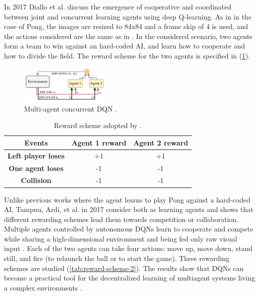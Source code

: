 In 2017 Diallo et al. \cite{diallo2017learning} discuss the emergence of cooperative and coordinated between joint and concurrent learning
agents using deep Q-learning.
%
As in \cite{mnih2013playing} in the case of Pong, the images are resized to 84x84 and a frame skip of 4 is used, and the actions considered are the same as in \cite{makarov2017learning}.
%
In the considered scenario, two agents form a team to win against an hard-coded AI,
and learn how to cooperate and how to divide the field.
%
The reward scheme for the two agents is specified in (\cref{tab:reward-scheme}).

\begin{figure}[ht]
  \centering
  \includegraphics[width=0.4\textwidth]{images/DQN_MAS.png}
  \caption{Multi-agent concurrent DQN \cite{diallo2017learning}.}
  \label{fig:dqnmas}
\end{figure}

\begin{table}[ht]
  \renewcommand{\arraystretch}{1.3}
  \caption{Reward scheme adopted by \cite{diallo2017learning}.}
  \label{tab:reward-scheme}
  \centering
  \begin{tabular}{@{}ccc@{}}
    \toprule
    \textbf{Events}            & \textbf{Agent 1 reward} & \textbf{Agent 2 reward} \\ \midrule
    \textbf{Left player loses} & +1                      & +1                      \\
    \textbf{One agent loses}   & -1                      & -1                      \\
    \textbf{Collision}         & -1                      & -1                      \\ \bottomrule
  \end{tabular}
\end{table}

Unlike previous works where the agent learns to play Pong against a hard-coded AI,
Tampuu, Ardi, et al. \cite{tampuu2017multiagent} in 2017 consider both as learning agents and shows that different rewarding schemes lead them towards competition or collaboration.
%
Multiple agents controlled by autonomous DQNs learn to cooperate and compete while sharing a high-dimensional environment and being fed only raw visual input \cite{tampuu2017multiagent}.
%
Each of the two agents can take four actions: 
move up, move down, stand still, and fire (to relaunch the ball or to start the game).
%
Three rewarding schemes are studied (\cref{tab:reward-scheme-2}).
%
The results show that DQNs can become a practical tool for the decentralized learning of multiagent systems living a complex environments \cite{tampuu2017multiagent}.

